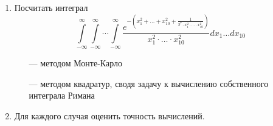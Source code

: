 \begin{enumerate}
	\item Посчитать интеграл
	\begin{equation*}\label{integral}
	\int\limits_{-\infty}^{\infty} \int\limits_{-\infty}^\infty \cdots
     \int\limits_{-\infty}^\infty \frac{e^{-\left(x_1^2 + \ldots + x_{10}^2
     + \frac{1}{ 2^7\cdot x_1^2 \cdot \ldots \cdot x_{10}^2}\right)}}{x_1^2
     \cdot \ldots \cdot x_{10}^2}dx_1\ldots dx_{10}
	\end{equation*}
	\begin{itemize}
		\item[---] методом Монте-Карло
		\item[---] методом квадратур, сводя задачу к вычислению собственного
         интеграла Римана
	\end{itemize}
	\item Для каждого случая оценить точность вычислений.
\end{enumerate}

